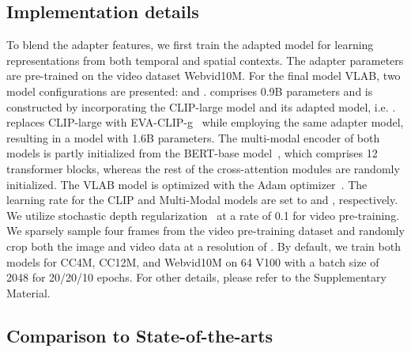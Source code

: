 \documentclass{article}
\begin{document}
\subsection{Implementation details}

To blend the adapter features, we first train the adapted model  for learning representations from both temporal and spatial contexts. The adapter parameters are pre-trained on the video dataset Webvid10M. For the final model VLAB, two model configurations are presented:  and . 
 comprises 0.9B parameters and is constructed by incorporating the CLIP-large model and its adapted model, i.e. .  replaces CLIP-large with EVA-CLIP-g~\cite{fang2022eva} while employing the same adapter model, resulting in a model with 1.6B parameters. The multi-modal encoder of both models is partly initialized from the BERT-base model~\cite{devlin2018bert}, which comprises 12 transformer blocks, whereas the rest of the cross-attention modules are randomly initialized. The VLAB model is optimized with the Adam optimizer~\cite{kingma2014adam}. The learning rate for the CLIP and Multi-Modal models are set to  and , respectively. We utilize stochastic depth regularization~\cite{huang2016deep} at a rate of 0.1 for video pre-training. We sparsely sample four frames from the video pre-training dataset and randomly crop both the image and video data at a resolution of . By default, we train both models for CC4M, CC12M, and Webvid10M on 64 V100 with a batch size of 2048 for 20/20/10 epochs. For other details, please refer to the Supplementary Material.

\subsection{Comparison to State-of-the-arts}
\label{sec:sota}
\end{document}
